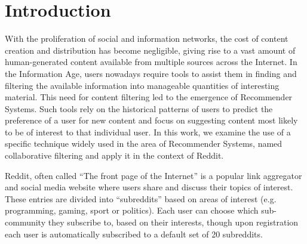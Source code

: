 \documentclass[conference, 12pt]{IEEEtran}
\begin{document}
%
\IEEEpeerreviewmaketitle

% 
% 
% 
% 
\section{Introduction}
With the proliferation of social and information networks, the cost of content creation and distribution has become negligible, giving rise to a vast amount of human-generated content available from multiple sources across the Internet. In the Information Age, users nowadays require tools to assist them in finding and filtering the available information into manageable quantities of interesting material. This need for content filtering led to the emergence of Recommender Systems. Such tools rely on the historical patterns of users to predict the preference of a user for new content and focus on suggesting content most likely to be of interest to that individual user. In this work, we examine the use of a specific technique widely used in the area of Recommender Systems, named collaborative filtering and apply it in the context of Reddit.

Reddit, often called \enquote{The front page of the Internet} is a popular link aggregator and social media website where users share and discuss their topics of interest. These entries are divided into \enquote{subreddits} based on areas of interest (e.g. programming, gaming, sport or politics). Each user can choose which sub-community they subscribe to, based on their interests, though upon registration each user is automatically subscribed to a default set of 20 subreddits. 
\end{document}
